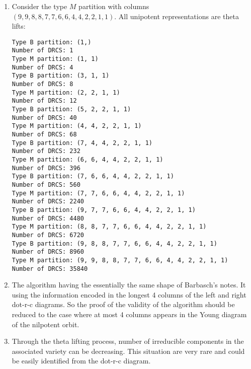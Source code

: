 \documentclass[12pt,a4paper]{amsart}
\numberwithin{equation}{section}
\theoremstyle{remark}
\begin{document}
{\begin{enumerate}
        \vspace{-0.5em}
\begin{lstlisting}
Type D partition: (2,)
Number of DRCS: 4
Type C partition: (1, 1)
Number of DRCS: 3
Type D partition: (4, 1, 1)
Number of DRCS: 20
Type C partition: (3, 3, 1, 1)
Number of DRCS: 17
Type D partition: (6, 3, 3, 1, 1)
Number of DRCS: 116
Type C partition: (5, 5, 3, 3, 1, 1)
Number of DRCS: 99
Type D partition: (8, 5, 5, 3, 3, 1, 1)
Number of DRCS: 676
Type C partition: (7, 7, 5, 5, 3, 3, 1, 1)
Number of DRCS: 577
Type D partition: (8, 7, 7, 5, 5, 3, 3, 1, 1)
Number of DRCS: 1632
Type C partition: (8, 8, 7, 7, 5, 5, 3, 3, 1, 1)
Number of DRCS: 3264
Type D partition: (10, 8, 8, 7, 7, 5, 5, 3, 3, 1, 1)
Number of DRCS: 13056
Type C partition: (9, 9, 8, 8, 7, 7, 5, 5, 3, 3, 1, 1)
Number of DRCS: 9792
\end{lstlisting}
\item
        Consider the type $M$ partition with columns
        $(9,9,8,8,7,7,6,6,4,4,2,2,1,1)$.
        All unipotent representations are theta lifts:
        \vspace{-0.5em}
\begin{lstlisting}
Type B partition: (1,)
Number of DRCS: 1
Type M partition: (1, 1)
Number of DRCS: 4
Type B partition: (3, 1, 1)
Number of DRCS: 8
Type M partition: (2, 2, 1, 1)
Number of DRCS: 12
Type B partition: (5, 2, 2, 1, 1)
Number of DRCS: 40
Type M partition: (4, 4, 2, 2, 1, 1)
Number of DRCS: 68
Type B partition: (7, 4, 4, 2, 2, 1, 1)
Number of DRCS: 232
Type M partition: (6, 6, 4, 4, 2, 2, 1, 1)
Number of DRCS: 396
Type B partition: (7, 6, 6, 4, 4, 2, 2, 1, 1)
Number of DRCS: 560
Type M partition: (7, 7, 6, 6, 4, 4, 2, 2, 1, 1)
Number of DRCS: 2240
Type B partition: (9, 7, 7, 6, 6, 4, 4, 2, 2, 1, 1)
Number of DRCS: 4480
Type M partition: (8, 8, 7, 7, 6, 6, 4, 4, 2, 2, 1, 1)
Number of DRCS: 6720
Type B partition: (9, 8, 8, 7, 7, 6, 6, 4, 4, 2, 2, 1, 1)
Number of DRCS: 8960
Type M partition: (9, 9, 8, 8, 7, 7, 6, 6, 4, 4, 2, 2, 1, 1)
Number of DRCS: 35840
\end{lstlisting}
  \item The algorithm having the essentially the same shape of Barbasch's notes.
        It using the information encoded in the longest 4 columns of the left
        and right dot-r-c diagrams. So the proof of the validity of the
        algorithm should be reduced to the case where at most 4 columns appears
        in the Young diagram of the nilpotent orbit.
  \item Through the theta lifting process, number of irreducible components in the
        associated variety can be decreasing. This situation are very rare and
        could be easily identified from the dot-r-c diagram.
\end{enumerate}

}
\end{document}

